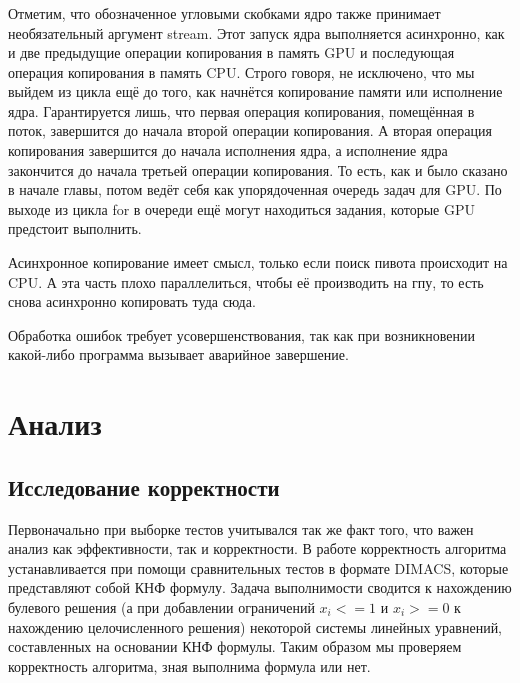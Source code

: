 \documentclass[a4paper,14pt,russian]{extreport}
\begin{document}
\subsection{}
\par
Отметим, что обозначенное угловыми скобками ядро также принимает необязательный аргумент stream. Этот запуск ядра выполняется асинхронно, как и две предыдущие операции копирования в память GPU и последующая операция копирования в  память CPU. Строго говоря, не исключено, что мы выйдем из цикла ещё до того, как начнётся копирование памяти или исполнение ядра. Гарантируется лишь, что первая операция копирования, помещённая в поток, завершится до начала второй операции копирования. А вторая операция копирования завершится до начала исполнения ядра, а исполнение ядра закончится до начала третьей операции копирования. То есть, как и было сказано в начале главы, потом ведёт себя как упорядоченная очередь задач для GPU. По выходе из цикла for в очереди ещё могут находиться задания, которые GPU предстоит выполнить.
\par 
Асинхронное копирование имеет смысл, только если поиск пивота происходит на CPU. А эта часть плохо параллелиться, чтобы её производить на гпу, то есть снова асинхронно копировать туда сюда.
\par 
Обработка ошибок требует усовершенствования, так как при возникновении какой-либо программа вызывает аварийное завершение. 
\par 

\chapter{Анализ}
\section{Исследование корректности}
Первоначально при выборке тестов учитывался так же факт того, что важен анализ как эффективности, так и корректности. В работе корректность алгоритма устанавливается при помощи сравнительных тестов в формате DIMACS, которые представляют собой КНФ формулу. Задача выполнимости сводится к нахождению булевого решения (а при добавлении ограничений $x_i <= 1$ и $x_i >= 0$ к нахождению целочисленного решения) некоторой системы линейных уравнений, составленных на основании КНФ формулы. Таким образом мы проверяем корректность алгоритма, зная выполнима формула или нет.
\par
\end{document}
